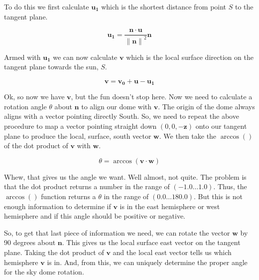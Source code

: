 \documentclass[12pt]{article}
\begin{document}
To do this we first calculate $\mathbf{u_1}$ which is the shortest
distance from point $S$ to the tangent plane.

\begin{equation}
  \mathbf{u_1} = \frac { \mathbf{n} \cdot \mathbf{u} }
             { {\| \mathbf{n} \|}^2 } \mathbf{n}
\end{equation}

Armed with $\mathbf{u_1}$ we can now calculate
$\mathbf{v}$ which is the local surface direction on the tangent
plane towards the sun, $S$.

\begin{equation}
  \mathbf{v} = \mathbf{v_0} + \mathbf{u} - \mathbf{u_1}
\end{equation}

Ok, so now we have $\mathbf{v}$, but the fun doesn't stop here.  Now
we need to calculate a rotation angle $\theta$ about $\mathbf{n}$ to
align our dome with $\mathbf{v}$.  The origin of the dome always
aligns with a vector pointing directly South.  So, we need to repeat
the above procedure to map a vector pointing straight down $( 0, 0,
-\mathbf{z} )$ onto our tangent plane to produce the local, surface,
south vector $\mathbf{w}$.  We then take the $\arccos()$ of the dot product
of $\mathbf{v}$ with $\mathbf{w}$.

\begin{equation}
  \theta = \arccos( \mathbf{v} \cdot \mathbf{w} )
\end{equation}

Whew, that gives us the angle we want.  Well almost, not quite.  The
problem is that the dot product returns a number in the range of
$(-1.0 \ldots 1.0)$. Thus, the $\arccos()$ function returns a $\theta$
in the range of $(0.0 \ldots 180.0)$.  But this is not enough
information to determine if $\mathbf{v}$ is in the east hemisphere or
west hemisphere and if this angle should be positive or negative.

So, to get that last piece of information we need, we can rotate the
vector $\mathbf{w}$ by 90 degrees about $\mathbf{n}$.  This gives us
the local surface east vector on the tangent plane.  Taking the dot
product of $\mathbf{v}$ and the local east vector tells us which
hemisphere $\mathbf{v}$ is in.  And, from this, we can uniquely
determine the proper angle for the sky dome rotation.
\end{document}
